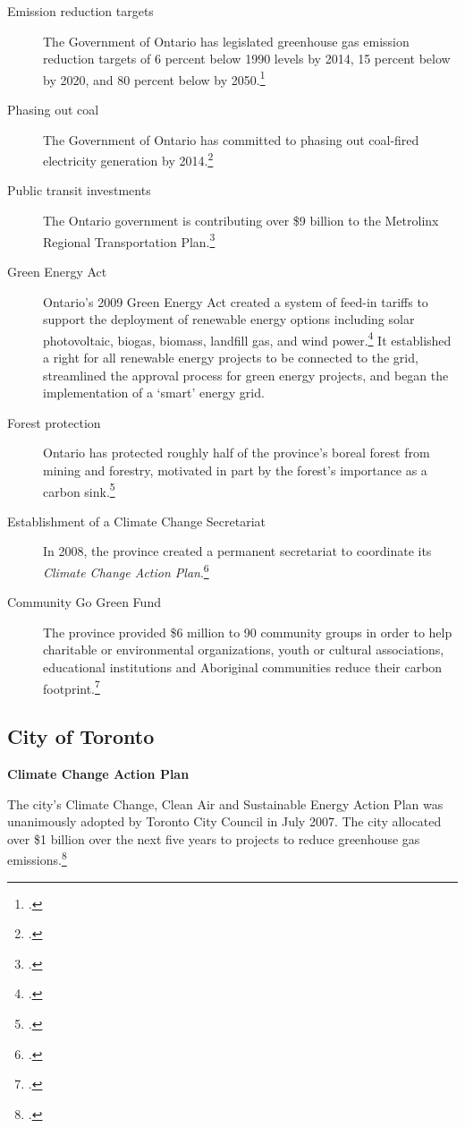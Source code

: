 \begin{description}
	\item[Emission reduction targets] The Government of Ontario has legislated greenhouse gas emission reduction targets of 6 percent below 1990 levels by 2014, 15 percent below by 2020, and 80 percent below by 2050.\footcite[][p.3]{20082009ActionPlan}
	\item[Phasing out coal] The Government of Ontario has committed to phasing out coal-fired electricity generation by 2014.\footcite[][]{EPACessation}
	\item[Public transit investments] The Ontario government is contributing over \$9 billion to the Metrolinx Regional Transportation Plan.\footcite[][]{OMEGreening}
	\item[Green Energy Act] Ontario's 2009 Green Energy Act created a system of feed-in tariffs to support the deployment of renewable energy options including solar photovoltaic, biogas, biomass, landfill gas, and wind power.\footcite[][]{OMEGreen} 
It established a right for all renewable energy projects to be connected to the grid, streamlined the approval process for green energy projects, and began the implementation of a `smart' energy grid.
	\item[Forest protection] Ontario has protected roughly half of the province's boreal forest from mining and forestry, motivated in part by the forest's importance as a carbon sink.\footcite[][]{RobbingCarbonBank}
	\item[Establishment of a Climate Change Secretariat] In 2008, the province created a permanent secretariat to coordinate its \emph{Climate Change Action Plan}.\footcite[][]{OMEGreening}
	\item[Community Go Green Fund] The province provided \$6 million to 90 community groups in order to help charitable or environmental organizations, youth or cultural associations, educational institutions and Aboriginal communities reduce their carbon footprint.\footcite[][]{OMEGreening}
\end{description}	



	\subsection{City of Toronto}



\textbf{Climate Change Action Plan}



The city's Climate Change, Clean Air and Sustainable Energy Action Plan was unanimously adopted by Toronto City Council in July 2007. The city allocated over \$1 billion over the next five years to projects to reduce greenhouse gas emissions.\footcite{TorontoEnvOff2007}



